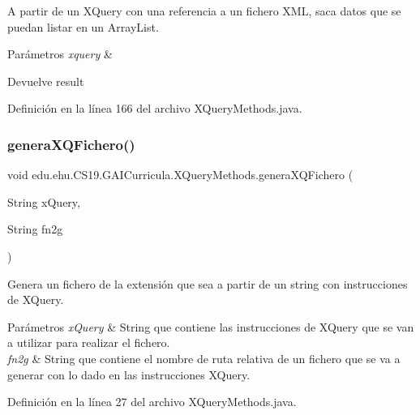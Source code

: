 A partir de un X\+Query con una referencia a un fichero X\+ML, saca datos que se puedan listar en un Array\+List. 


\begin{DoxyParams}{Parámetros}
{\em xquery} & \\
\hline
\end{DoxyParams}
\begin{DoxyReturn}{Devuelve}
result 
\end{DoxyReturn}


Definición en la línea 166 del archivo X\+Query\+Methods.\+java.

\mbox{\label{classedu_1_1ehu_1_1_c_s19_1_1_g_a_i_curricula_1_1_x_query_methods_a7d2040d47b8350ca48da7ce5b658fab2}} 
\subsubsection{\texorpdfstring{generaXQFichero()}{generaXQFichero()}}
{\footnotesize\ttfamily void edu.\+ehu.\+C\+S19.\+G\+A\+I\+Curricula.\+X\+Query\+Methods.\+genera\+X\+Q\+Fichero (\begin{DoxyParamCaption}\item[{String}]{x\+Query,  }\item[{String}]{fn2g }\end{DoxyParamCaption})}



Genera un fichero de la extensión que sea a partir de un string con instrucciones de X\+Query. 


\begin{DoxyParams}{Parámetros}
{\em x\+Query} & String que contiene las instrucciones de X\+Query que se van a utilizar para realizar el fichero. \\
\hline
{\em fn2g} & String que contiene el nombre de ruta relativa de un fichero que se va a generar con lo dado en las instrucciones X\+Query. \\
\hline
\end{DoxyParams}


Definición en la línea 27 del archivo X\+Query\+Methods.\+java.

\mbox{\label{classedu_1_1ehu_1_1_c_s19_1_1_g_a_i_curricula_1_1_x_query_methods_ae60f32c5f8b4ffe3f2bdd1f44976eacf}} 
